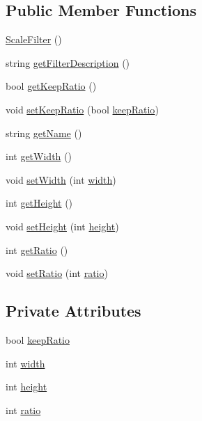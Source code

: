 \subsection*{Public Member Functions}
\begin{DoxyCompactItemize}
\item 
\hyperlink{classModel_1_1ScaleFilter_a97c359581f0dd70601196694efdace5a}{Scale\+Filter} ()
\item 
string \hyperlink{classModel_1_1ScaleFilter_a62b7b60e24f92234393b840b35808e06}{get\+Filter\+Description} ()
\item 
bool \hyperlink{classModel_1_1ScaleFilter_a24f2abc27a0f228db8763dbecb6ad326}{get\+Keep\+Ratio} ()
\item 
void \hyperlink{classModel_1_1ScaleFilter_a8a9a32b92c6a9dc160091d8886ba13dc}{set\+Keep\+Ratio} (bool \hyperlink{classModel_1_1ScaleFilter_a2a8bde298e312d75b2de36f51698a1b1}{keep\+Ratio})
\item 
string \hyperlink{classModel_1_1ScaleFilter_a11335e13e50af74108bf926dc1340b4b}{get\+Name} ()
\item 
int \hyperlink{classModel_1_1ScaleFilter_a67a0997183f24da19b776d96c1052998}{get\+Width} ()
\item 
void \hyperlink{classModel_1_1ScaleFilter_a8b4c8bccc530aa0a9b0139e04913af32}{set\+Width} (int \hyperlink{classModel_1_1ScaleFilter_a2474a5474cbff19523a51eb1de01cda4}{width})
\item 
int \hyperlink{classModel_1_1ScaleFilter_a07efb2a4e9a982688c8bb3c3f21d1092}{get\+Height} ()
\item 
void \hyperlink{classModel_1_1ScaleFilter_a7013185ad2825ade83994b396c4fdfcd}{set\+Height} (int \hyperlink{classModel_1_1ScaleFilter_ad12fc34ce789bce6c8a05d8a17138534}{height})
\item 
int \hyperlink{classModel_1_1ScaleFilter_ae46369a45bda66dc98d82f36c3025e79}{get\+Ratio} ()
\item 
void \hyperlink{classModel_1_1ScaleFilter_a862467c05166d50d0ea15bca3ca1414d}{set\+Ratio} (int \hyperlink{classModel_1_1ScaleFilter_a79e45999bba256f0615955bc9b13f414}{ratio})
\end{DoxyCompactItemize}
\subsection*{Private Attributes}
\begin{DoxyCompactItemize}
\item 
bool \hyperlink{classModel_1_1ScaleFilter_a2a8bde298e312d75b2de36f51698a1b1}{keep\+Ratio}
\item 
int \hyperlink{classModel_1_1ScaleFilter_a2474a5474cbff19523a51eb1de01cda4}{width}
\item 
int \hyperlink{classModel_1_1ScaleFilter_ad12fc34ce789bce6c8a05d8a17138534}{height}
\item 
int \hyperlink{classModel_1_1ScaleFilter_a79e45999bba256f0615955bc9b13f414}{ratio}
\end{DoxyCompactItemize}
